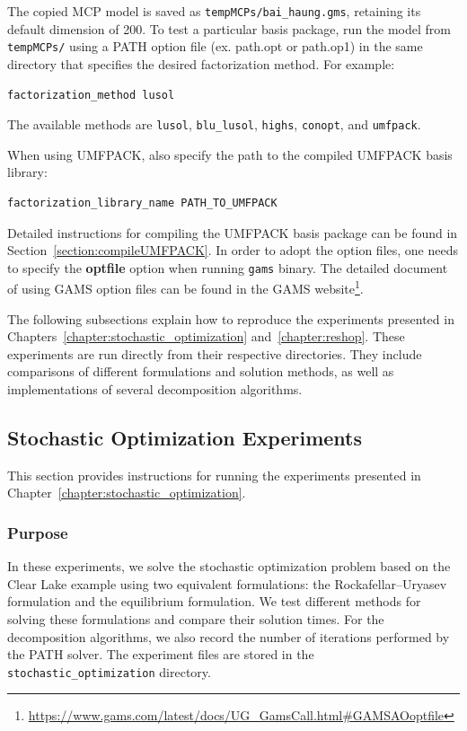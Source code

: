 The copied MCP model is saved as \texttt{tempMCPs/bai\_haung.gms}, retaining its default dimension of 200. To test a particular basis package, run the model from \texttt{tempMCPs/} using a PATH option file (ex. path.opt or path.op1) in the same directory that specifies the desired factorization method. For example:

\begin{verbatim}
factorization_method lusol
\end{verbatim}

The available methods are \texttt{lusol}, \texttt{blu\_lusol}, \texttt{highs}, \texttt{conopt}, and \texttt{umfpack}.

When using UMFPACK, also specify the path to the compiled UMFPACK basis library:

\begin{verbatim}
factorization_library_name PATH_TO_UMFPACK
\end{verbatim}

Detailed instructions for compiling the UMFPACK basis package can be found in Section~\ref{section:compileUMFPACK}. In order to adopt the option files, one needs to specify the \textbf{optfile} option when running \texttt{gams} binary. The detailed document of using GAMS option files can be found in the GAMS website\footnote{\url{https://www.gams.com/latest/docs/UG_GamsCall.html\#GAMSAOoptfile}}.

The following subsections explain how to reproduce the experiments presented in Chapters~\ref{chapter:stochastic_optimization} and~\ref{chapter:reshop}. These experiments are run directly from their respective directories. They include comparisons of different formulations and solution methods, as well as implementations of several decomposition algorithms.

\subsection{Stochastic Optimization Experiments}

This section provides instructions for running the experiments presented in Chapter~\ref{chapter:stochastic_optimization}.

\subsubsection{Purpose}

In these experiments, we solve the stochastic optimization problem based on the Clear Lake example using two equivalent formulations: the Rockafellar--Uryasev formulation and the equilibrium formulation. We test different methods for solving these formulations and compare their solution times. For the decomposition algorithms, we also record the number of iterations performed by the PATH solver. The experiment files are stored in the \texttt{stochastic\_optimization} directory.

